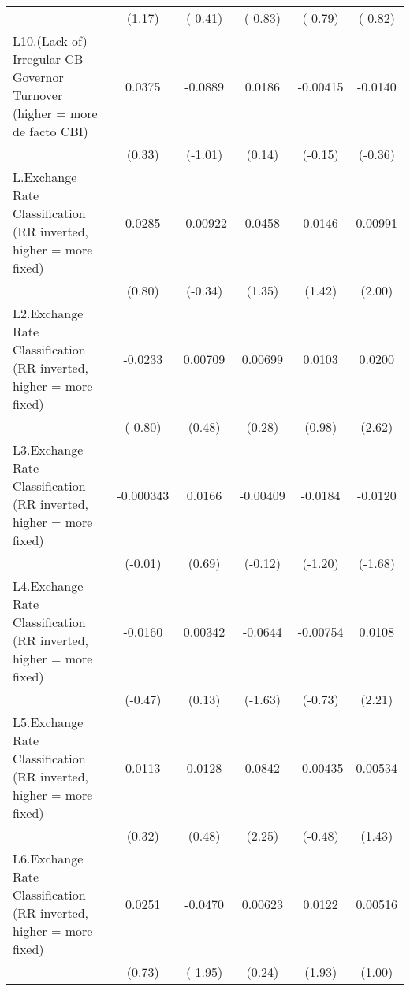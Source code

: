 {\begin{tabular}{l*{5}{c}}
                &   (1.17)         &  (-0.41)         &  (-0.83)         &  (-0.79)         &  (-0.82)         \\
[1em]
L10.(Lack of) Irregular CB Governor Turnover (higher = more de facto CBI)&   0.0375         &  -0.0889         &   0.0186         & -0.00415         &  -0.0140         \\
                &   (0.33)         &  (-1.01)         &   (0.14)         &  (-0.15)         &  (-0.36)         \\
[1em]
L.Exchange Rate Classification (RR inverted, higher = more fixed)&   0.0285         & -0.00922         &   0.0458         &   0.0146         &  0.00991\sym{*}  \\
                &   (0.80)         &  (-0.34)         &   (1.35)         &   (1.42)         &   (2.00)         \\
[1em]
L2.Exchange Rate Classification (RR inverted, higher = more fixed)&  -0.0233         &  0.00709         &  0.00699         &   0.0103         &   0.0200\sym{**} \\
                &  (-0.80)         &   (0.48)         &   (0.28)         &   (0.98)         &   (2.62)         \\
[1em]
L3.Exchange Rate Classification (RR inverted, higher = more fixed)&-0.000343         &   0.0166         & -0.00409         &  -0.0184         &  -0.0120         \\
                &  (-0.01)         &   (0.69)         &  (-0.12)         &  (-1.20)         &  (-1.68)         \\
[1em]
L4.Exchange Rate Classification (RR inverted, higher = more fixed)&  -0.0160         &  0.00342         &  -0.0644         & -0.00754         &   0.0108\sym{*}  \\
                &  (-0.47)         &   (0.13)         &  (-1.63)         &  (-0.73)         &   (2.21)         \\
[1em]
L5.Exchange Rate Classification (RR inverted, higher = more fixed)&   0.0113         &   0.0128         &   0.0842\sym{*}  & -0.00435         &  0.00534         \\
                &   (0.32)         &   (0.48)         &   (2.25)         &  (-0.48)         &   (1.43)         \\
[1em]
L6.Exchange Rate Classification (RR inverted, higher = more fixed)&   0.0251         &  -0.0470         &  0.00623         &   0.0122         &  0.00516         \\
                &   (0.73)         &  (-1.95)         &   (0.24)         &   (1.93)         &   (1.00)         \\

\end{tabular}}
